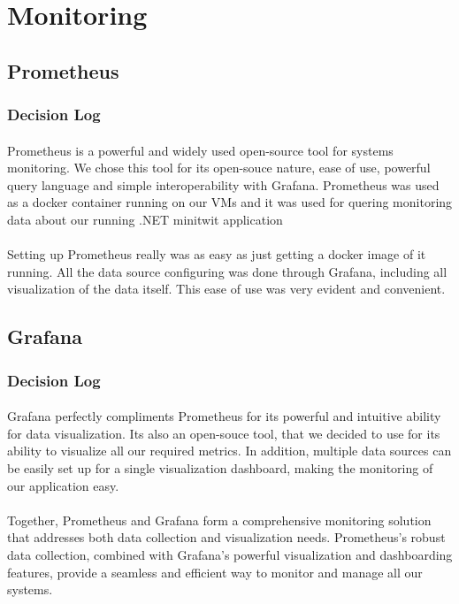 \section{Monitoring}
\subsection{Prometheus}
\subsubsection{Decision Log}
\paragraph{} Prometheus is a powerful and widely used open-source tool for systems monitoring. We chose this tool for its open-souce nature, ease of use, powerful query language and simple interoperability with Grafana. Prometheus was used as a docker container running on our VMs and it was used for quering monitoring data about our running .NET minitwit application
\paragraph{} Setting up Prometheus really was as easy as just getting a docker image of it running. All the data source configuring was done through Grafana, including all visualization of the data itself. This ease of use was very evident and convenient.

\subsection{Grafana}
\subsubsection{Decision Log}
\paragraph{} Grafana perfectly compliments Prometheus for its powerful and intuitive ability for data visualization. Its also an open-souce tool, that we decided to use for its ability to visualize all our required metrics. In addition, multiple data sources can be easily set up for a single visualization dashboard, making the monitoring of our application easy.

\paragraph{} Together, Prometheus and Grafana form a comprehensive monitoring solution that addresses both data collection and visualization needs. Prometheus's robust data collection, combined with Grafana's powerful visualization and dashboarding features, provide a seamless and efficient way to monitor and manage all our systems.

